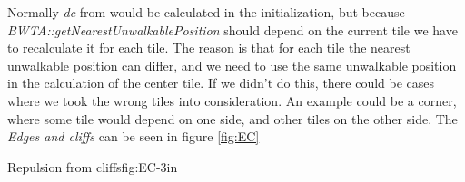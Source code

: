 	
	Normally \textit{dc} from  would be calculated in the initialization, but because \\ \textit{BWTA::getNearestUnwalkablePosition} should depend on the current tile we have to recalculate it for each tile. The reason is that for each tile the nearest unwalkable position can differ, and we need to use the same unwalkable position in the calculation of the center tile. If we didn't do this, there could be cases where 
	we took the wrong tiles into consideration. An example could be a corner, where some tile would depend on one side, and other tiles on the other side. 
	The \textit{Edges and cliffs} can be seen in figure \ref{fig:EC}

			{Repulsion from cliffs}{fig:EC}{-3in}
